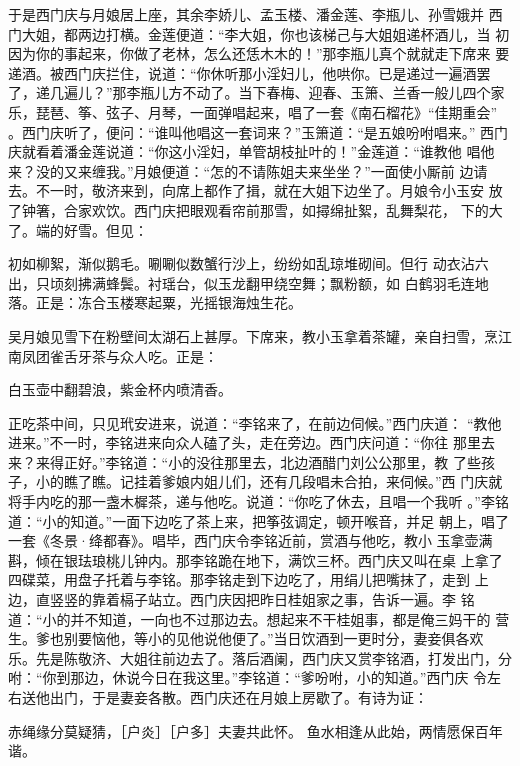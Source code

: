 于是西门庆与月娘居上座，其余李娇儿、孟玉楼、潘金莲、李瓶儿、孙雪娥并
西门大姐，都两边打横。金莲便道：“李大姐，你也该梯己与大姐姐递杯酒儿，当
初因为你的事起来，你做了老林，怎么还恁木木的！”那李瓶儿真个就就走下席来
要递酒。被西门庆拦住，说道：“你休听那小淫妇儿，他哄你。已是递过一遍酒罢
了，递几遍儿？”那李瓶儿方不动了。当下春梅、迎春、玉箫、兰香一般儿四个家
乐，琵琶、筝、弦子、月琴，一面弹唱起来，唱了一套《南石榴花》“佳期重会”
。西门庆听了，便问：“谁叫他唱这一套词来？”玉箫道：“是五娘吩咐唱来。”
西门庆就看着潘金莲说道：“你这小淫妇，单管胡枝扯叶的！”金莲道：“谁教他
唱他来？没的又来缠我。”月娘便道：“怎的不请陈姐夫来坐坐？”一面使小厮前
边请去。不一时，敬济来到，向席上都作了揖，就在大姐下边坐了。月娘令小玉安
放了钟箸，合家欢饮。西门庆把眼观看帘前那雪，如撏绵扯絮，乱舞梨花，
下的大了。端的好雪。但见：

初如柳絮，渐似鹅毛。唰唰似数蟹行沙上，纷纷如乱琼堆砌间。但行
动衣沾六出，只顷刻拂满蜂鬓。衬瑶台，似玉龙翻甲绕空舞；飘粉额，如
白鹤羽毛连地落。正是：冻合玉楼寒起粟，光摇银海烛生花。

吴月娘见雪下在粉壁间太湖石上甚厚。下席来，教小玉拿着茶罐，亲自扫雪，烹江
南凤团雀舌牙茶与众人吃。正是：

白玉壶中翻碧浪，紫金杯内喷清香。

正吃茶中间，只见玳安进来，说道：“李铭来了，在前边伺候。”西门庆道：
“教他进来。”不一时，李铭进来向众人磕了头，走在旁边。西门庆问道：“你往
那里去来？来得正好。”李铭道：“小的没往那里去，北边酒醋门刘公公那里，教
了些孩子，小的瞧了瞧。记挂着爹娘内姐儿们，还有几段唱未合拍，来伺候。”西
门庆就将手内吃的那一盏木樨茶，递与他吃。说道：“你吃了休去，且唱一个我听
。”李铭道：“小的知道。”一面下边吃了茶上来，把筝弦调定，顿开喉音，并足
朝上，唱了一套《冬景·绛都春》。唱毕，西门庆令李铭近前，赏酒与他吃，教小
玉拿壶满斟，倾在银珐琅桃儿钟内。那李铭跪在地下，满饮三杯。西门庆又叫在桌
上拿了四碟菜，用盘子托着与李铭。那李铭走到下边吃了，用绢儿把嘴抹了，走到
上边，直竖竖的靠着槅子站立。西门庆因把昨日桂姐家之事，告诉一遍。李
铭道：“小的并不知道，一向也不过那边去。想起来不干桂姐事，都是俺三妈干的
营生。爹也别要恼他，等小的见他说他便了。”当日饮酒到一更时分，妻妾俱各欢
乐。先是陈敬济、大姐往前边去了。落后酒阑，西门庆又赏李铭酒，打发出门，分
咐：“你到那边，休说今日在我这里。”李铭道：“爹吩咐，小的知道。”西门庆
令左右送他出门，于是妻妾各散。西门庆还在月娘上房歇了。有诗为证：

赤绳缘分莫疑猜，［户炎］［户多］夫妻共此怀。
鱼水相逢从此始，两情愿保百年谐。

